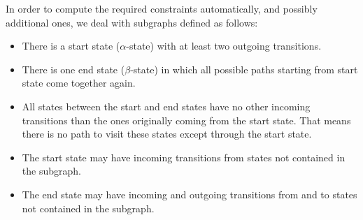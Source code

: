 In order to compute the required constraints automatically, and possibly additional ones, we deal with subgraphs defined as follows:

\begin{itemize}
	\item There is a start state ($\alpha$-state) with at least two outgoing transitions.
	\item There is one end state ($\beta$-state) in which all possible paths starting from start state come together again.
	\item All states between the start and end states have no other incoming transitions than the ones originally coming from the start state. That means there is no path to visit these states except through the start state.
	\item The start state may have incoming transitions from states not contained in the subgraph.
	\item The end state may have incoming and outgoing transitions from and to states not contained in the subgraph.
\end{itemize}



